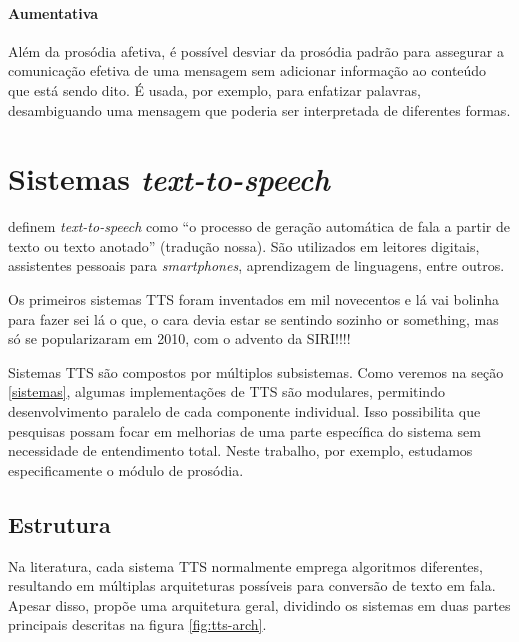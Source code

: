 \paragraph{Aumentativa} Além da prosódia afetiva, é possível desviar da prosódia
padrão para assegurar a comunicação efetiva de uma mensagem sem adicionar
informação ao conteúdo que está sendo dito. É usada, por exemplo, para
enfatizar palavras, desambiguando uma mensagem que poderia ser interpretada de
diferentes formas.

\section{Sistemas \emph{text-to-speech}}
 definem \emph{text-to-speech} como ``o processo de geração
automática de fala a partir de texto ou texto anotado'' (tradução nossa). São
utilizados em leitores digitais, assistentes pessoais para \emph{smartphones},
aprendizagem de linguagens, entre outros.

Os primeiros sistemas TTS foram inventados em mil novecentos e lá vai bolinha
para fazer sei lá o que, o cara devia estar se sentindo sozinho or something,
mas só se popularizaram em 2010, com o advento da SIRI!!!!

Sistemas TTS são compostos por múltiplos subsistemas. Como veremos na seção
\ref{sistemas}, algumas implementações de TTS são modulares, permitindo
desenvolvimento paralelo de cada componente individual. Isso possibilita que
pesquisas possam focar em melhorias de uma parte específica do sistema sem
necessidade de entendimento total. Neste trabalho, por exemplo, estudamos
especificamente o módulo de prosódia. %

\subsection{Estrutura}
Na literatura, cada sistema TTS normalmente emprega algoritmos diferentes,
resultando em múltiplas arquiteturas possíveis para conversão de texto em fala.
Apesar disso,  propõe uma arquitetura geral, dividindo os
sistemas em duas partes principais descritas na figura \ref{fig:tts-arch}.

